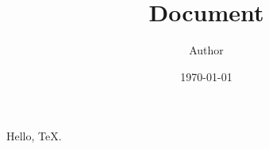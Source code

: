 \documentclass{article}
\title{Document}
\author{Author}
\date{\today}
\begin{document}
\maketitle
Hello, TeX.
\end{document}
